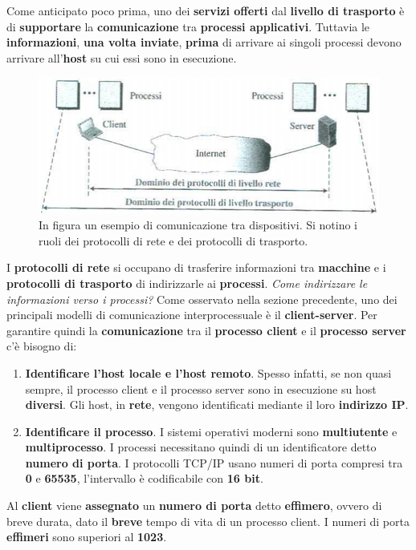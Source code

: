 \documentclass[11pt,a4paper]{article}
\theoremstyle{definition}
\begin{document}
Come anticipato poco prima, uno dei \textbf{servizi offerti} dal \textbf{livello di trasporto} è di \textbf{supportare} la \textbf{comunicazione} tra \textbf{processi applicativi}. Tuttavia le \textbf{informazioni}, \textbf{una volta inviate}, \textbf{prima} di arrivare ai singoli processi devono arrivare all'\textbf{host} su cui essi sono in esecuzione.
\begin{figure}[!h]
	\includegraphics[scale=0.9]{Immagini/Trasporto_host.png}
	\centering
	\caption{In figura un esempio di comunicazione tra dispositivi. Si notino i ruoli dei protocolli di rete e dei protocolli di trasporto.}
\end{figure}\newline
I \textbf{protocolli di rete} si occupano di trasferire informazioni tra \textbf{macchine} e i \textbf{protocolli di trasporto} di indirizzarle ai \textbf{processi}.
\newpage
\textit{Come indirizzare le informazioni verso i processi?}\newline\newline
Come osservato nella sezione precedente, uno dei principali modelli di comunicazione interprocessuale è il \textbf{client-server}. Per garantire quindi la \textbf{comunicazione} tra il \textbf{processo client} e il \textbf{processo server} c'è bisogno di:
\begin{enumerate}
	\item \textbf{Identificare l'host locale e l'host remoto}. Spesso infatti, se non quasi sempre, il processo client e il processo server sono in esecuzione su host \textbf{diversi}. Gli host, in \textbf{rete}, vengono identificati mediante il loro \textbf{indirizzo IP}.
	\item \textbf{Identificare il processo}. I sistemi operativi moderni sono \textbf{multiutente} e \textbf{multiprocesso}. I processi necessitano quindi di un  identificatore detto \textbf{numero di porta}. I protocolli TCP/IP usano numeri di porta compresi tra \textbf{0} e \textbf{65535}, l'intervallo è codificabile con \textbf{16 bit}.
\end{enumerate}
Al \textbf{client} viene \textbf{assegnato} un \textbf{numero di porta} detto \textbf{effimero}, ovvero di breve durata, dato il \textbf{breve} tempo di vita di un processo client. I numeri di porta \textbf{effimeri} sono superiori al \textbf{1023}.\newline
\end{document}
